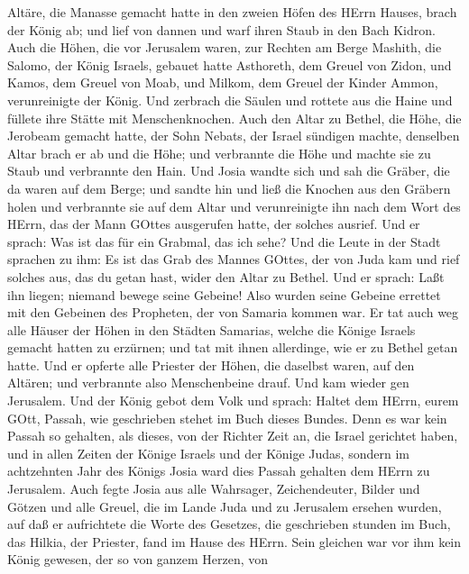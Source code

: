 Altäre, die Manasse gemacht hatte in den zweien Höfen des HErrn Hauses,
brach der König ab; und lief von dannen und warf ihren Staub in den Bach
Kidron.  Auch die Höhen, die vor Jerusalem waren, zur
Rechten am Berge Mashith, die Salomo, der König Israels, gebauet hatte
Asthoreth, dem Greuel von Zidon, und Kamos, dem Greuel von Moab, und
Milkom, dem Greuel der Kinder Ammon, verunreinigte der König.
 Und zerbrach die Säulen und rottete aus die Haine und
füllete ihre Stätte mit Menschenknochen.  Auch den Altar zu
Bethel, die Höhe, die Jerobeam gemacht hatte, der Sohn Nebats, der
Israel sündigen machte, denselben Altar brach er ab und die Höhe; und
verbrannte die Höhe und machte sie zu Staub und verbrannte den Hain.
 Und Josia wandte sich und sah die Gräber, die da waren auf
dem Berge; und sandte hin und ließ die Knochen aus den Gräbern holen und
verbrannte sie auf dem Altar und verunreinigte ihn nach dem Wort des
HErrn, das der Mann GOttes ausgerufen hatte, der solches ausrief.
 Und er sprach: Was ist das für ein Grabmal, das ich sehe?
Und die Leute in der Stadt sprachen zu ihm: Es ist das Grab des Mannes
GOttes, der von Juda kam und rief solches aus, das du getan hast, wider
den Altar zu Bethel.  Und er sprach: Laßt ihn liegen;
niemand bewege seine Gebeine! Also wurden seine Gebeine errettet mit den
Gebeinen des Propheten, der von Samaria kommen war.  Er tat
auch weg alle Häuser der Höhen in den Städten Samarias, welche die
Könige Israels gemacht hatten zu erzürnen; und tat mit ihnen allerdinge,
wie er zu Bethel getan hatte.  Und er opferte alle Priester
der Höhen, die daselbst waren, auf den Altären; und verbrannte also
Menschenbeine drauf. Und kam wieder gen Jerusalem.  Und der
König gebot dem Volk und sprach: Haltet dem HErrn, eurem GOtt, Passah,
wie geschrieben stehet im Buch dieses Bundes.  Denn es war
kein Passah so gehalten, als dieses, von der Richter Zeit an, die Israel
gerichtet haben, und in allen Zeiten der Könige Israels und der Könige
Judas,  sondern im achtzehnten Jahr des Königs Josia ward
dies Passah gehalten dem HErrn zu Jerusalem.  Auch fegte
Josia aus alle Wahrsager, Zeichendeuter, Bilder und Götzen und alle
Greuel, die im Lande Juda und zu Jerusalem ersehen wurden, auf daß er
aufrichtete die Worte des Gesetzes, die geschrieben stunden im Buch, das
Hilkia, der Priester, fand im Hause des HErrn.  Sein
gleichen war vor ihm kein König gewesen, der so von ganzem Herzen, von
